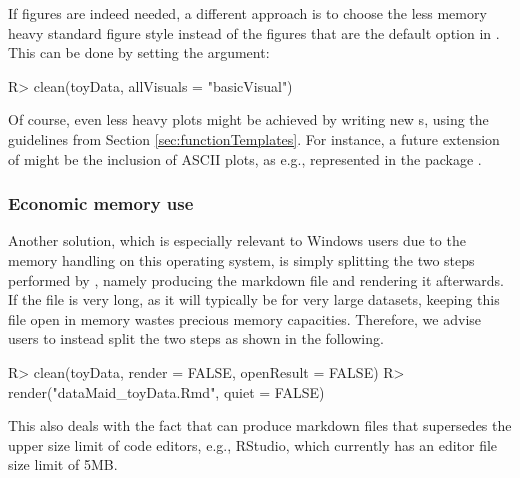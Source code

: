 \documentclass[article,shortnames]{jss}
\newcommand{\hl}[1]{\textcolor{magenta}{#1}}
\begin{document}
If figures are indeed needed, a different approach is to choose the
less memory heavy standard  figure style instead of the
 figures that are the default option in . This
can be done by setting the  argument:

\begin{Schunk}
\begin{Sinput}
R> clean(toyData, allVisuals = "basicVisual")
\end{Sinput}
\end{Schunk}

Of course, even less heavy plots might be achieved by writing new
s, using the guidelines from Section
\ref{sec:functionTemplates}. For instance, a future extension of
 might be the inclusion of ASCII plots, as
e.g., represented in the  package  \citep{txtplot}.


\subsubsection{Economic memory use}
Another solution, which is
especially relevant to Windows users due to %
the memory handling on this operating system,
is simply splitting the two steps performed
by , namely producing the  markdown file and rendering it
afterwards. If the  file is very long, as it will
typically be for very large datasets, keeping this file open in memory
wastes precious memory capacities. Therefore, we advise users to
instead split the two steps as shown in the following.

\begin{Schunk}
\begin{Sinput}
R> clean(toyData, render = FALSE, openResult = FALSE)
R> render("dataMaid_toyData.Rmd", quiet = FALSE)
\end{Sinput}
\end{Schunk}

This also deals with the fact that  can produce
 markdown files that supersedes the upper size limit of code editors, e.g.,
RStudio, which currently has an editor file size limit of 5MB. %
\end{document}
